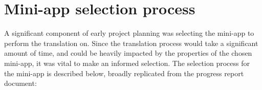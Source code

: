 



\section{Mini-app selection process}
\label{sec:miniapp-selection}

A significant component of early project planning was selecting the mini-app to perform the translation on. Since the translation process would take a significant amount of time, and could be heavily impacted by the properties of the chosen mini-app, it was vital to make an informed selection. The selection process for the mini-app is described below, broadly replicated from the progress report document:

